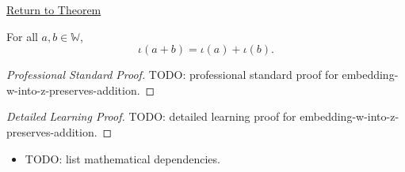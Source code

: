 \newpage
{}
\label{prf:embedding-w-into-z-preserves-addition}

\begin{remark*}[Return]
\hyperref[thm:embedding-w-into-z-preserves-addition]{Return to Theorem}
\end{remark*}

\begin{theorem*}
For all $a,b\in\mathbb{W}$,
\[
\iota(a+b)=\iota(a)+\iota(b).
\]
\end{theorem*}

\begin{proof}[Professional Standard Proof]
\LRAProofBodyStart
TODO: professional standard proof for embedding-w-into-z-preserves-addition.
\end{proof}

\begin{proof}[Detailed Learning Proof]
\LRAProofBodyStart
TODO: detailed learning proof for embedding-w-into-z-preserves-addition.
\end{proof}

\begin{remark*}
\end{remark*}

\begin{dependencies}
\begin{itemize}
  \item TODO: list mathematical dependencies.
\end{itemize}
\end{dependencies}

\clearpage

